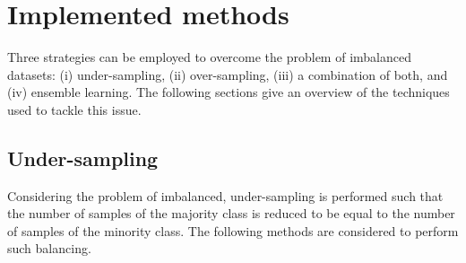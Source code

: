 \documentclass[twoside,11pt]{article}
\begin{document}
\section{Implemented methods}

Three strategies can be employed to overcome the problem of imbalanced datasets: 
(i) under-sampling, (ii) over-sampling, (iii) a combination of both, and (iv) ensemble learning.
The following sections give an overview of the techniques used to tackle this issue.

\subsection{Under-sampling}

Considering the problem of imbalanced, under-sampling is performed such that the number of samples of the majority class is reduced to be equal to the number of samples of the minority class.
The following methods are considered to perform such balancing.
\end{document}
